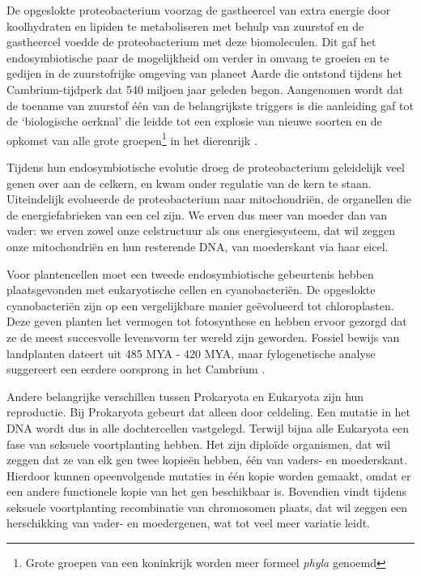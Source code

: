 \documentclass[
  11pt,
]{book}
\begin{document}
De opgeslokte proteobacterium voorzag de gastheercel van extra energie door koolhydraten en lipiden te metaboliseren met behulp van zuurstof en de gastheercel voedde de proteobacterium met deze biomoleculen. Dit gaf het endosymbiotische paar de mogelijkheid om verder in omvang te groeien en te gedijen in de zuurstofrijke omgeving van planeet Aarde die ontstond tijdens het Cambrium-tijdperk dat 540 miljoen jaar geleden begon. Aangenomen wordt dat de toename van zuurstof één van de belangrijkste triggers is die aanleiding gaf tot de `biologische oerknal' die leidde tot een explosie van nieuwe soorten en de opkomst van alle grote groepen\footnote{Grote groepen van een koninkrijk worden meer formeel \emph{phyla} genoemd} in het dierenrijk \citep{he2019}.

Tijdens hun endosymbiotische evolutie droeg de proteobacterium geleidelijk veel genen over aan de celkern, en kwam onder regulatie van de kern te staan. Uiteindelijk evolueerde de proteobacterium naar mitochondriën, de organellen die de energiefabrieken van een cel zijn. We erven dus meer van moeder dan van vader: we erven zowel onze celstructuur als ons energiesysteem, dat wil zeggen onze mitochondriën en hun resterende DNA, van moederskant via haar eicel.

Voor plantencellen moet een tweede endosymbiotische gebeurtenis hebben plaatsgevonden met eukaryotische cellen en cyanobacteriën. De opgeslokte cyanobacteriën zijn op een vergelijkbare manier geëvolueerd tot chloroplasten. Deze geven planten het vermogen tot fotosynthese en hebben ervoor gezorgd dat ze de meest succesvolle levensvorm ter wereld zijn geworden. Fossiel bewijs van landplanten dateert uit 485 MYA - 420 MYA, maar fylogenetische analyse suggereert een eerdere oorsprong in het Cambrium \citep{StrotherFoster2021}.

Andere belangrijke verschillen tussen Prokaryota en Eukaryota zijn hun reproductie. Bij Prokaryota gebeurt dat alleen door celdeling. Een mutatie in het DNA wordt dus in alle dochtercellen vastgelegd. Terwijl bijna alle Eukaryota een fase van seksuele voortplanting hebben. Het zijn diploïde organismen, dat wil zeggen dat ze van elk gen twee kopieën hebben, één van vaders- en moederskant. Hierdoor kunnen opeenvolgende mutaties in één kopie worden gemaakt, omdat er een andere functionele kopie van het gen beschikbaar is. Bovendien vindt tijdens seksuele voortplanting recombinatie van chromosomen plaats, dat wil zeggen een herschikking van vader- en moedergenen, wat tot veel meer variatie leidt.
\end{document}
